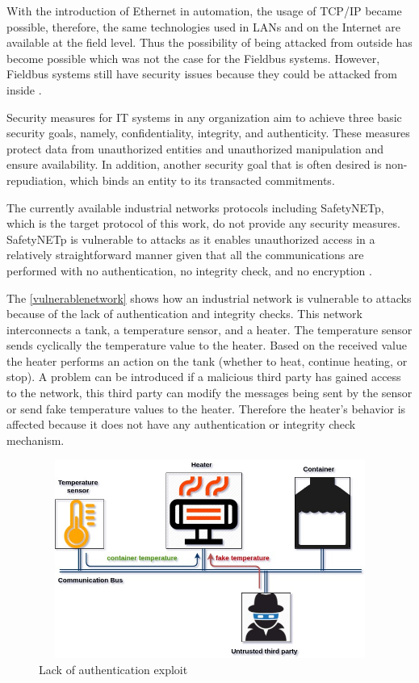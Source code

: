 With the introduction of Ethernet in automation, the usage of \ac{TCP}/\ac{IP} became possible, therefore, the same technologies used in LANs
and on the Internet are available at the field level. Thus the possibility of being attacked from outside has become possible which was not the case for the Fieldbus systems.
However, Fieldbus systems still have security issues because they could be attacked from inside \cite{zurawski2014industrial}.

Security measures for IT systems in any organization aim to achieve three basic security goals,
namely, confidentiality, integrity, and authenticity. These measures protect data from unauthorized
entities and unauthorized manipulation and ensure availability. In addition,
another security goal that is often desired is non-repudiation, which binds an entity to its transacted
commitments.

The currently available industrial networks protocols including SafetyNETp, which is the target protocol of this work, do not provide any security measures.
SafetyNETp is vulnerable to attacks as it enables unauthorized access in a relatively straightforward manner given that all the communications are performed with no authentication, no integrity check, and no encryption \cite{zurawski2014industrial}.

The \autoref{vulnerablenetwork} shows how an industrial network is vulnerable to attacks because of the lack of authentication and integrity checks.
This network interconnects a tank, a temperature sensor, and a heater. The temperature sensor sends cyclically the temperature value to the heater. Based on the
received value the heater performs an action on the tank (whether to heat, continue heating, or stop). A problem can be introduced if a malicious third party has gained access to the network,
this third party can modify the messages being sent by the sensor or send fake temperature values to the heater. Therefore the heater's behavior is affected because it does not have any authentication or integrity check mechanism.
\begin{figure}
\centering
\includegraphics[width=12cm,height=6.5cm]{figures/general_intro/problematic.jpg}
\caption{Lack of authentication exploit}\label{vulnerablenetwork}
\end{figure}

